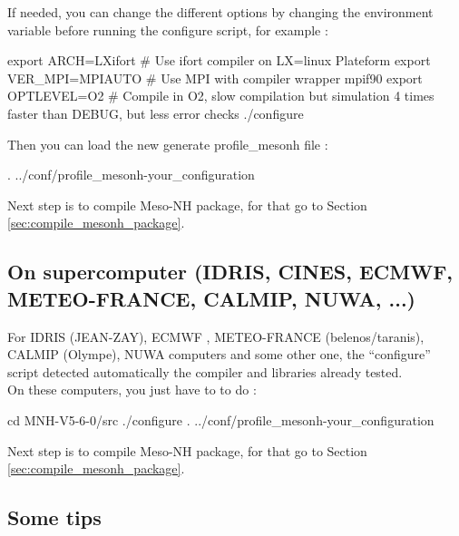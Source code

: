 If needed, you can change the different options by changing the environment variable before running the configure script, for example :
\begin{bashcode}
export ARCH=LXifort        # Use ifort compiler on LX=linux Plateform 
export VER_MPI=MPIAUTO     # Use MPI with compiler wrapper mpif90
export OPTLEVEL=O2         # Compile in O2, slow compilation but simulation 4 times faster than DEBUG, but less error checks
 ./configure 
\end{bashcode}

Then you can load the new generate profile\_mesonh file :
\begin{bashcode}
. ../conf/profile_mesonh-your_configuration
\end{bashcode}

Next step is to compile Meso-NH package, for that go to Section \ref{sec:compile_mesonh_package}.

\subsection{On supercomputer (IDRIS, CINES, ECMWF, METEO-FRANCE, CALMIP, NUWA, ...)}

For IDRIS (JEAN-ZAY), ECMWF , METEO-FRANCE (belenos/taranis), CALMIP (Olympe), NUWA computers and some other one, the ``configure'' script detected automatically the compiler and libraries already tested. \\

On these computers, you just have to to do :
\begin{bashcode}
 cd MNH-V5-6-0/src
 ./configure
 . ../conf/profile_mesonh-your_configuration
 \end{bashcode}

Next step is to compile Meso-NH package, for that go to Section \ref{sec:compile_mesonh_package}.
 
\subsection{Some tips}

